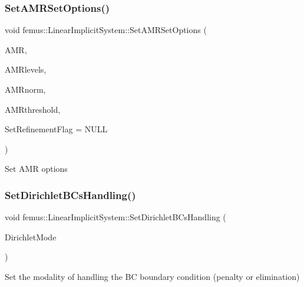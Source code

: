 \subsubsection{\texorpdfstring{Set\+A\+M\+R\+Set\+Options()}{SetAMRSetOptions()}}
{\footnotesize\ttfamily void femus\+::\+Linear\+Implicit\+System\+::\+Set\+A\+M\+R\+Set\+Options (\begin{DoxyParamCaption}\item[{const std\+::string \&}]{A\+MR,  }\item[{const unsigned \&}]{A\+M\+Rlevels,  }\item[{const std\+::string \&}]{A\+M\+Rnorm,  }\item[{const double \&}]{A\+M\+Rthreshold,  }\item[{bool($\ast$)(const std\+::vector$<$ double $>$ \&x, const int \&Elem\+Group\+Number, const int \&level)}]{Set\+Refinement\+Flag = {\ttfamily NULL} }\end{DoxyParamCaption})}

Set A\+MR options \mbox{\label{classfemus_1_1_linear_implicit_system_a19479f6fb09ab437c3e2e7116ec3cd08}} 
\subsubsection{\texorpdfstring{Set\+Dirichlet\+B\+Cs\+Handling()}{SetDirichletBCsHandling()}}
{\footnotesize\ttfamily void femus\+::\+Linear\+Implicit\+System\+::\+Set\+Dirichlet\+B\+Cs\+Handling (\begin{DoxyParamCaption}\item[{const \mbox{\hyperlink{_dirichlet_b_c_type_enum_8hpp_a642eeb34fa6e30051fcb1258b649e241}{Dirichlet\+B\+C\+Type}}}]{Dirichlet\+Mode }\end{DoxyParamCaption})}

Set the modality of handling the BC boundary condition (penalty or elimination) \mbox{\label{classfemus_1_1_linear_implicit_system_a9521cfdd56da0ec0bc439066ce950bb0}} 
